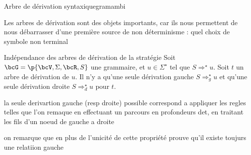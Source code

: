 \begin{example}{Arbre de dérivation syntaxique}{gramambi}
\begin{minipage}{0.5\linewidth}
\begin{center}
        \end{center}
        \end{minipage}
    \end{example}
    
    Les arbres de dérivation sont des objets importants, car ils nous permettent de nous débarrasser d'une première source de non déterminisme : quel choix de symbole non terminal 
    
    \begin{property}{Indépendance des arbres de dérivation de la stratégie}{}
        Soit $\bcG = \p{\bcV, \Sigma, \bcR, S}$ une grammaire, et $u \in \Sigma^\star$ tel que $S \Rightarrow^\star u$. Soit $t$ un arbre de dérivation de $u$. Il n'y a  qu'une seule dérivation gauche $S \Rightarrow^\star_g u$ et qu'une seule dérivation droite $S \Rightarrow^\star_d u$ pour $t$.
    \end{property}
    
    \begin{nproof}
    
    la seule derivartion gauche (resp droite) possible correspond a appliquer les regles telles que l'on remaque en effectuant un parcours en profondeurs det, en traitant les fils d'un noeud de gauche a droite 
    
    
    \end{nproof}
    on remarque que en plus de l'unicité de cette propriété prouve qu'il existe toujurs une relatiion gauche 
    
